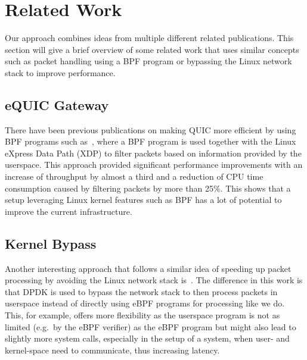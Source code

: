 \section{Related Work}\label{sec:related_work}

Our approach combines ideas from multiple different 
related publications.
This section will give a brief overview of some related work 
that uses similar concepts such as packet handling using a BPF 
program or bypassing the Linux network stack to improve performance.

\subsection{eQUIC Gateway}
There have been previous publications on making QUIC more efficient by using BPF programs
such as~\parencite{equic-gateway}, where a BPF program is used together with the Linux
eXpress Data Path (XDP) to filter packets based on information provided by the userspace.
This approach provided significant performance improvements with an increase of throughput
by almost a third and a reduction of CPU time consumption caused by filtering packets by
more than 25\%.
This shows that a setup leveraging Linux kernel features such as BPF has a lot of potential
to improve the current infrastructure.

\subsection{Kernel Bypass}
Another interesting approach that follows a similar idea of speeding up packet processing
by avoiding the Linux network stack is~\parencite{kernel-bypass-msc-thesis}.
The difference in this work is that DPDK is used to bypass the network stack to 
then process packets in userspace instead of directly using eBPF programs for processing 
like we do.
This, for example, offers more flexibility as the userspace program is not as limited (e.g.\ 
by the eBPF verifier) as the eBPF program but might also lead to slightly more system calls,
especially in the setup of a system, when user- and kernel-space need to communicate, thus 
increasing latency.

